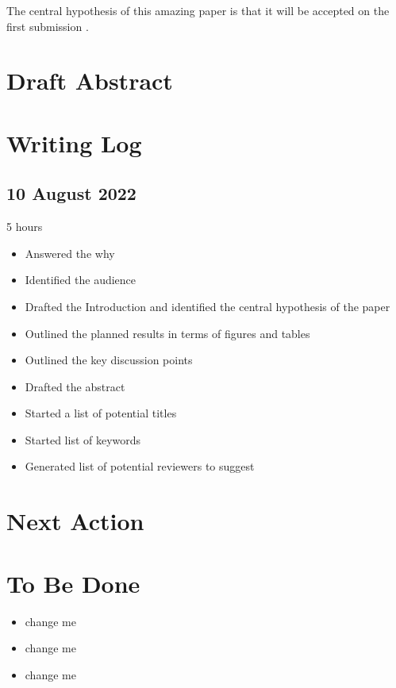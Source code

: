 \documentclass[10pt,letterpaper]{article}
\begin{document}
The central hypothesis of this amazing paper is that it will be accepted on the first submission \cite{chaloner1995bayesianexperimentaldesignareview}.


\section{Draft Abstract}



\section{Writing Log}

\subsection{10 August 2022}
5 hours

\begin{itemize}
  \item Answered the why
  \item Identified the audience
  \item Drafted the Introduction and identified the central hypothesis of the paper
  \item Outlined the planned results in terms of figures and tables
  \item Outlined the key discussion points
  \item Drafted the abstract
  \item Started a list of potential titles
  \item Started list of keywords
  \item Generated list of potential reviewers to suggest  
\end{itemize}


\section{Next Action}


\section{To Be Done}

\begin{itemize}
  \item change me
  \item change me
  \item change me
\end{itemize}
\end{document}
